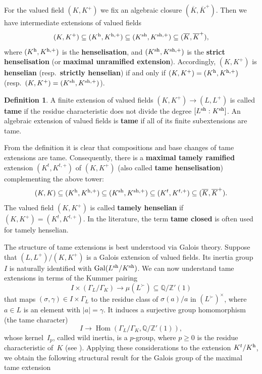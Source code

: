 \documentclass[a4paper,twoside,11pt,reqno]{amsart}
\renewcommand{\mathbb}{\mathds}
\newcommand{\bQ}{{\mathbb Q}}
\newcommand{\bZ}{{\mathbb Z}}
\DeclareMathOperator{\Hom}{Hom}
\DeclareMathOperator{\Gal}{Gal}
\newcommand{\sh}{{\rm sh}}   %
\newcommand{\rh}{{\rm h}}  %
\theoremstyle{definition}
\newtheorem{defi}[thm]{Definition}
\numberwithin{equation}{subsection}
\begin{document}
For the valued field $(K,K^+)$ we fix an algebraic closure $(\overline{K},\overline{K}^+)$.
Then we have intermediate extensions of valued fields
\[
 (K,K^+) \subseteq (K^\rh,K^{\rh,+}) \subseteq (K^\sh,K^{\sh,+}) \subseteq (\overline{K},\overline{K}^+),
\]
where $(K^\rh,K^{\rh,+})$ is the {\bf henselisation}, and $(K^\sh,K^{\sh,+})$ is the {\bf strict henselisation} (or {\bf maximal unramified extension}).
Accordingly, $(K,K^+)$ is {\bf henselian} (resp.\ {\bf strictly henselian}) if and  only if $(K,K^+) = (K^\rh,K^{\rh,+})$ (resp.\ $(K,K^+) = (K^\sh,K^{\sh,+})$).

\begin{defi}
\label{defi:tame-extension-of-valued-fields}
    A finite extension of valued fields $(K,K^+) \to (L,L^+)$ is called \textbf{tame} if the residue characteristic does not divide the degree $[L^\sh:K^\sh]$.
    An algebraic extension of valued fields is \textbf{tame} if all of its finite subextensions are tame.
\end{defi}

From the definition it is clear that compositions and base changes of tame extensions are tame.
Consequently, there is a \textbf{maximal tamely ramified} extension $(K^t,K^{t,+})$ of $(K,K^+)$ (also called \textbf{tame henselisation}) complementing the above tower:
\[
 (K,K) \subseteq (K^\rh,K^{\rh,+}) \subseteq (K^\sh,K^{\sh,+}) \subseteq (K^t,K^{t,+}) \subseteq (\overline{K},\overline{K}^+).
\]
The valued field $(K,K^+)$ is called {\bf tamely henselian} if $(K,K^+) = (K^t,K^{t,+})$.
In the literature, the term {\bf tame closed} is often used for tamely henselian.

The structure of tame extensions is best understood via Galois theory.
Suppose that $(L,L^+)/(K,K^+)$ is a Galois extension of valued fields.
Its inertia group~$I$ is naturally identified with $\Gal(L^\sh/K^\sh)$.
We can now understand tame extensions in terms of the Kummer pairing
\[
 I \times (\Gamma_L/\Gamma_K) \longrightarrow \mu(L^\succ) \subseteq \bQ/\bZ'(1) 
\]
that maps $(\sigma,\gamma) \in I \times \Gamma_L$ to the residue class of $\sigma(a)/a$ in $(L^\succ)^\times$, where $a \in L$ is an element with $\lvert a \rvert = \gamma$.
It induces a surjective group homomorphism (the tame character)
\begin{equation} \label{Kummer-hom}
 I \longrightarrow \Hom(\Gamma_L/\Gamma_K,\bQ/\bZ'(1)), 
\end{equation}
whose kernel~$I_p$, called wild inertia, is a $p$-group, where $p \ge 0$ is the residue characteristic of~$K$ (see \cite[Proposition~6.2.12]{GabberRamero}).
Applying these considerations to the extension $K^t/K^\rh$, we obtain the following structural result for the Galois group of the maximal tame extension
\end{document}
